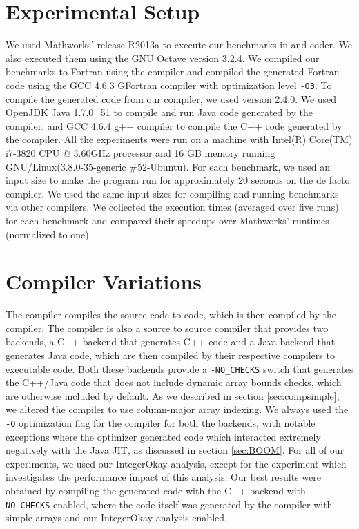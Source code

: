 \section{Experimental Setup}

We used Mathworks' \matlab release R2013a to execute our benchmarks in \matlab
and \matlab coder. We also executed them using the GNU Octave version 3.2.4. We
compiled our benchmarks to Fortran using the \mctwofor compiler and compiled
the generated Fortran code using the GCC 4.6.3 GFortran compiler with
optimization level \texttt{-O3}. To compile the generated \xten code from our
\mixten compiler, we used \xten version 2.4.0. We used OpenJDK Java 1.7.0\_51
to compile and run Java code generated by the \xten compiler, and GCC 4.6.4 g++
compiler to compile the C++ code generated by the \xten compiler. All the
experiments were run on a machine with Intel(R) Core(TM) i7-3820 CPU @ 3.60GHz
processor and 16 GB memory running GNU/Linux(3.8.0-35-generic \#52-Ubuntu). For
each benchmark, we used an input size to make the program run for approximately
20 seconds on the de facto \matlab compiler. We used the same input sizes for
compiling and running benchmarks via other compilers. We collected the
execution times (averaged over five runs) for each benchmark and compared their
speedups over Mathworks' \matlab runtimes (normalized to one). 

\section{\xten Compiler Variations}

The \mixten compiler compiles the source \matlab code to \xten code, which is
then compiled by the \xten compiler. The \xten compiler is also a source to 
source compiler that provides two
backends, a C++ backend that generates C++ code and a Java backend that
generates Java code, which are then compiled by their respective compilers to
executable code.  Both these backends provide a \texttt{-NO\_CHECKS}
switch that generates the C++/Java code that does not include dynamic
array bounds checks, which are otherwise included by default.  As we
described in section \ref{sec:compsimple}, we altered the \xten compiler to use
column-major array indexing.  We always used the \texttt{-O}
optimization flag for the \xten compiler for both the backends, with
notable exceptions where the \xten optimizer generated code which
interacted extremely negatively with the Java JIT, as discussed in
section \ref{sec:BOOM}.  For all of our experiments, we used our IntegerOkay
analysis, except for the experiment which investigates the performance
impact of this analysis. Our best results were obtained by compiling the
generated \xten code with the C++ backend with \texttt{-NO\_CHECKS}
enabled, where the \xten code itself was generated by the \mixten
compiler with simple arrays and our IntegerOkay analysis enabled. 

